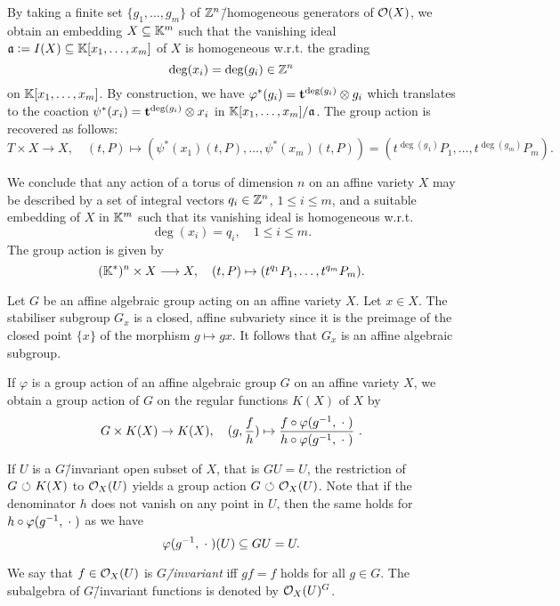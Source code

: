 \begin{construction}
	By taking a finite set $\{g_1,\dots,g_m\}$ of $\mathbb{Z}^n$\=/homogeneous generators of $\mathcal{O}(X)$, we obtain an embedding $X\subseteq\mathbb{K}^m$ such that the vanishing ideal $\mathfrak{a} \mathrel{\mathop:}= I(X)\subseteq\mathbb{K}[x_1,\dots,x_m]$ of $X$ is homogeneous w.r.t. the grading
	$$\deg(x_i) = \deg(g_i)\in\mathbb{Z}^n$$
	on $\mathbb{K}[x_1,\dots,x_m]$.
	By construction, we have $\varphi^*(g_i) = \mathbf{t}^{\deg(g_i)} \otimes g_i$ which translates to the coaction  $\psi^*(x_i) = \mathbf{t}^{\deg(g_i)} \otimes x_i$ in $\mathbb{K}[x_1,\dots,x_m] / \mathfrak{a}$.
	The group action is recovered as follows:
	$$T \times X \longrightarrow X,\quad (t,P) \mapsto (\psi^*(x_1)(t,P),\dots,\psi^*(x_m)(t,P)) = (t^{\deg(g_1)}P_1,\dots,t^{\deg(g_m)}P_m).$$
	
	We conclude that any action of a torus of dimension $n$ on an affine variety $X$ may be described by a set of integral vectors $q_i\in\mathbb{Z}^n$, $1\leq i \leq m$, and a suitable embedding of $X$ in $\mathbb{K}^m$ such that its vanishing ideal is homogeneous w.r.t.
	$$\deg(x_i) = q_i,\quad 1\leq i \leq m.$$
	The group action is given by
	$$(\mathbb{K}^*)^n \times X \longrightarrow X,\quad (t,P) \mapsto (t^{q_1}P_1,\dots,t^{q_m}P_m).$$
\end{construction}

\begin{remark}
	Let $G$ be an affine algebraic group acting on an affine variety $X$. Let $x\in X$. The stabiliser subgroup $G_x$ is a closed, affine subvariety since it is the preimage of the closed point $\{x\}$ of the morphism $g\mapsto gx$. It follows that $G_x$ is an affine algebraic subgroup.
\end{remark}

\begin{remark}
	If $\varphi$ is a group action of an affine algebraic group $G$ on an affine variety $X$, we obtain a group action of $G$ on the regular functions $K(X)$ of $X$ by
	$$G\times K(X)\rightarrow K(X), \quad(g,\frac{f}{h}) \mapsto \frac{f\circ \varphi(g^{-1},\wildcard)}{h\circ \varphi(g^{-1},\wildcard)}\ .$$
	
	If $U$ is a $G$\=/invariant open subset of $X$, that is $GU = U$, the restriction of $G{\ \circlearrowleft\ } K(X)$ to $\mathcal{O}_X(U)$ yields a group action $G{\ \circlearrowleft\ }\mathcal{O}_X(U)$. Note that if the denominator $h$ does not vanish on any point in $U$, then the same holds for $h\circ \varphi(g^{-1},\mathrel{\;\cdot\;})$ as we have $$\varphi(g^{-1},\mathrel{\;\cdot\;})(U) \subseteq GU = U.$$
	
	We say that $f\in\mathcal{O}_X(U)$ is \emph{$G$\=/invariant} iff $gf = f$ holds for all $g\in G$. The subalgebra of $G$\=/invariant functions is denoted by $\mathcal{O}_X(U)^G$.
\end{remark}

